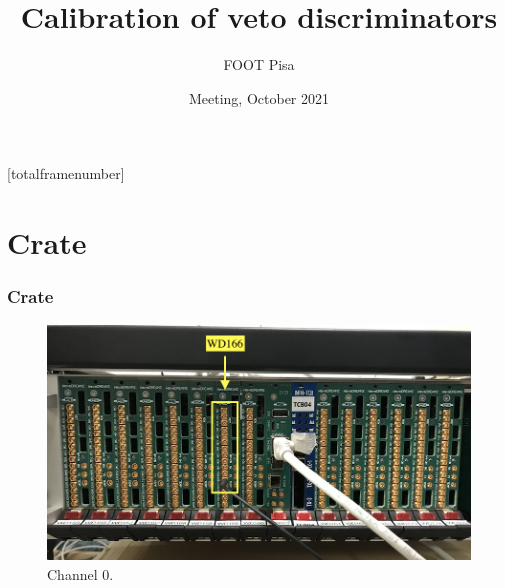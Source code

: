 \documentclass[9pt]{beamer}
\title{Calibration of veto discriminators}
\author{FOOT Pisa}
\institute{Lorenzo Marini}
\date[October 2021] %
{Meeting, October 2021}
\begin{document}
[totalframenumber] 

\frame{\titlepage}



\begin{frame} 
  	\tableofcontents
\end{frame}


\section{Crate}
\begin{frame} [fragile]
\small
	\frametitle{Crate}
    		\begin{figure}
		 \centering
			\includegraphics[scale=0.3]{photos/im2.png}
			\caption{Channel 0.}
		\end{figure}  
\end{frame}

\end{document}
